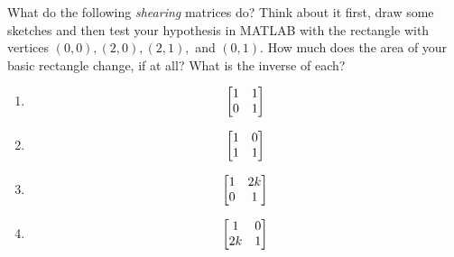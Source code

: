 \begin{prob}
What do the following \textit{shearing} matrices do? Think about it first, draw some sketches and then test your hypothesis in MATLAB with the rectangle with vertices $(0,0), (2,0), (2,1),$ and $(0,1)$. How much does the area of your basic rectangle change, if at all? What is the inverse of each?
\begin{enumerate}
\item \[ \begin{bmatrix} 1 & 1 \\ 0 & 1\end{bmatrix} \]

\item \[ \begin{bmatrix} 1 & 0 \\ 1 & 1\end{bmatrix} \]

\item \[ \begin{bmatrix} 1 & 2k \\ 0 & 1\end{bmatrix} \]

\item \[ \begin{bmatrix} 1 & 0 \\ 2k & 1\end{bmatrix} \]
\end{enumerate}
\end{prob}
